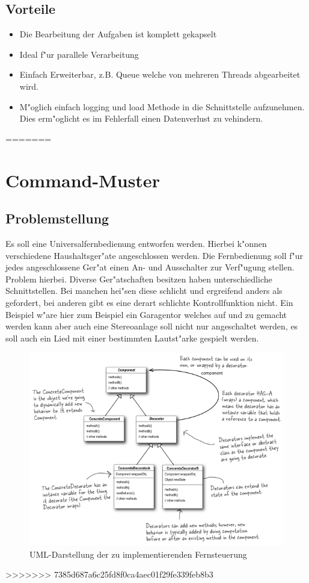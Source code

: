 \subsection{Vorteile}
\begin{itemize}
	\item Die Bearbeitung der Aufgaben ist komplett gekapselt
	\item Ideal f"ur parallele Verarbeitung
	\item Einfach Erweiterbar, z.B. Queue welche von mehreren Threads abgearbeitet wird. 
	\item M"oglich einfach logging und load Methode in die Schnittstelle aufzunehmen. Dies erm"oglicht es im Fehlerfall einen Datenverlust zu vehindern. 
\end{itemize}
=======
\section{Command-Muster}

\subsection{Problemstellung}
Es soll eine Universalfernbedienung entworfen werden. Hierbei k"onnen verschiedene Haushaltsger"ate angeschlossen werden. Die Fernbedienung soll f"ur jedes angeschlossene Ger"at einen An- und Ausschalter zur Verf"ugung stellen. Problem hierbei. Diverse Ger"atschaften besitzen haben unterschiedliche Schnittstellen. Bei manchen hei"sen diese schlicht und ergreifend anders als gefordert, bei anderen gibt es eine derart schlichte Kontrollfunktion nicht. Ein Beispiel w"are hier zum Beispiel ein Garagentor welches auf und zu gemacht werden kann aber auch eine Stereoanlage soll nicht nur angeschaltet werden, es soll auch ein Lied mit einer bestimmten Lautst"arke gespielt werden. 


\begin{figure}
	\centering
	\includegraphics{decorator/img/decoratorUML}
	\caption{UML-Darstellung der zu implementierenden Fernsteuerung}
	\label{fig:commandRemote}
\end{figure}
>>>>>>> 7385d687a6c25fd8f0ca4aec01f29fe339feb8b3
